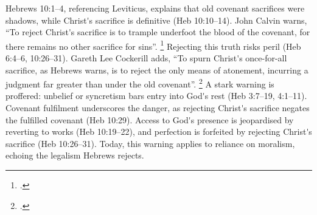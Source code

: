 \documentclass[12pt]{article}
\def\apos{^^27}         %
\def\christ{the Messiah}
\def\christ{Christ}
\begin{document}
Hebrews 10:1--4, referencing Leviticus, explains that old covenant sacrifices
were shadows, while \christ{}\apos{}s sacrifice is definitive (Heb 10:10--14).
John Calvin warns, ``To reject Christ\apos{}s sacrifice is to trample underfoot
the blood of the covenant, for there remains no other sacrifice for sins''.
\footcite[245]{Calvin1853} Rejecting this truth risks peril (Heb 6:4--6,
10:26--31).
%
Gareth Lee Cockerill adds, ``To spurn Christ\apos{}s once-for-all sacrifice, as
Hebrews warns, is to reject the only means of atonement, incurring a judgment
far greater than under the old covenant''. \footcite[482]{Cockerill2012}
%
A stark warning is proffered:
unbelief or syncretism bars entry into God\apos{}s rest (Heb 3:7--19, 4:1--11).
%
Covenant fulfilment underscores the danger, as rejecting \christ{}\apos{}s
sacrifice negates the fulfilled covenant (Heb 10:29).
%
Access to God\apos{}s presence is jeopardised by reverting to works (Heb
10:19--22), and perfection is forfeited by rejecting \christ{}\apos{}s sacrifice
(Heb 10:26--31).
%
Today, this warning applies to reliance on moralism, echoing the legalism
Hebrews rejects.
\end{document}

